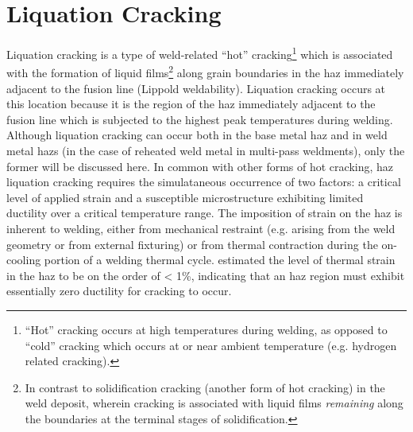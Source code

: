 \section{Liquation Cracking} \label{sec:liquation-cracking}
Liquation cracking is a type of weld-related “hot” cracking\footnote{“Hot” cracking occurs at high temperatures during welding, as opposed to “cold” cracking which occurs at or near ambient temperature (e.g. hydrogen related cracking).} which is associated with the formation of liquid films\footnote{In contrast to solidification cracking (another form of hot cracking) in the weld deposit, wherein cracking is associated with liquid films \emph{remaining} along the boundaries at the terminal stages of solidification.} along grain boundaries in the \gls{haz} immediately adjacent to the fusion line (Lippold weldability). Liquation cracking occurs at this location because it is the region of the \gls{haz} immediately adjacent to the fusion line which is subjected to the highest peak temperatures during welding. Although liquation cracking can occur both in the base metal \gls{haz} and in weld metal \gls{haz}s (in the case of reheated weld metal in multi-pass weldments), only the former will be discussed here. In common with other forms of hot cracking, \gls{haz} liquation cracking requires the simulataneous occurrence of two factors: a critical level of applied strain and a susceptible microstructure exhibiting limited ductility over a critical temperature range. The imposition of strain on the \gls{haz} is inherent to welding, either from mechanical restraint (e.g. arising from the weld geometry or from external fixturing) or from thermal contraction during the on-cooling portion of a welding thermal cycle. \citet{yeniscavich_correlation_1970} estimated the level of thermal strain in the \gls{haz} to be on the order of < 1\%, indicating that an \gls{haz} region must exhibit essentially zero ductility for cracking to occur. 


